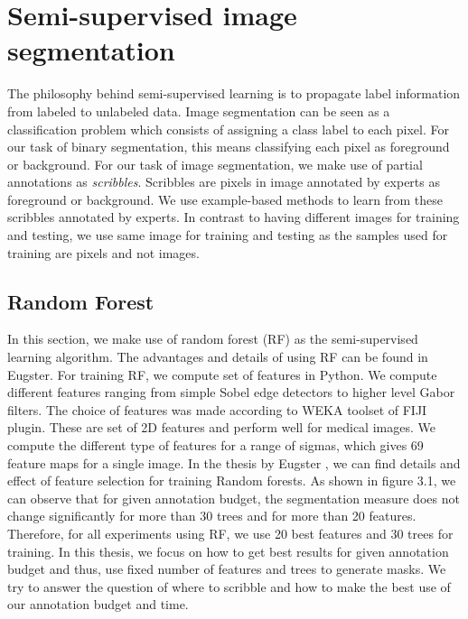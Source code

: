 %
\newpage
\chapter{Semi-supervised image segmentation}
The philosophy behind semi-supervised learning is to propagate label information from labeled to unlabeled data. Image segmentation can be seen as a classification problem which consists of assigning a class label to each pixel. For our task of binary segmentation, this means classifying each pixel as foreground or background. For our task of image segmentation, we make use of partial annotations as \textit{scribbles}. Scribbles are pixels in image annotated by experts as foreground or background. We use example-based methods to learn from these scribbles annotated by experts. In contrast to having different images for training and testing, we use same image for training and testing as the samples used for training are pixels and not images.

\section{Random Forest}
In this section, we make use of random forest (RF) as the semi-supervised learning algorithm. The advantages and details of using RF can be found in Eugster. For training RF, we compute set of features in Python. We compute different features ranging from simple Sobel edge detectors to higher level Gabor filters. The choice of features was made according to WEKA \cite{weka} toolset of FIJI \cite{fiji} plugin. These are set of 2D features and perform well for medical images. We compute the different type of features for a range of sigmas, which gives 69 feature maps for a single image. In the thesis by Eugster \cite{dominic}, we can find details and effect of feature selection for training Random forests. As shown in figure 3.1, we can observe that for given annotation budget, the segmentation measure does not change significantly for more than 30 trees and for more than 20 features. Therefore, for all experiments using RF, we use 20 best features and 30 trees for training. In this thesis, we focus on how to get best results for given annotation budget and thus, use fixed number of features and trees to generate masks.  We try to answer the question of where to scribble and how to make the best use of our annotation budget and time.

